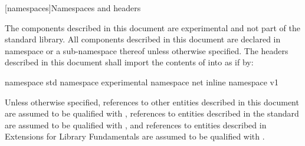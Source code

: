 
[namespaces]{Namespaces and headers}

\pnum
The components described in this document are experimental and not part of the \Cpp standard library. All components described in this document are declared in namespace  or a sub-namespace thereof unless otherwise specified. The headers described in this document shall import the contents of  into  as if by:

\begin{codeblock}
namespace std {
  namespace experimental {
    namespace net {
      inline namespace v1 {}
    }
  }
}
\end{codeblock}

\pnum
Unless otherwise specified, references to other entities described in this document are assumed to be qualified with , references to entities described in the \Cpp standard are assumed to be qualified with , and references to entities described in \Cpp Extensions for Library Fundamentals are assumed to be qualified with .


